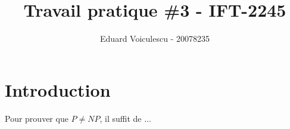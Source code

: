 \documentclass{article}
\title{Travail pratique \#3 - IFT-2245}
\author{Eduard Voiculescu - 20078235}
\begin{document}
\maketitle

\section{Introduction}

Pour prouver que $P \not= NP$, il suffit de ...
\end{document}
